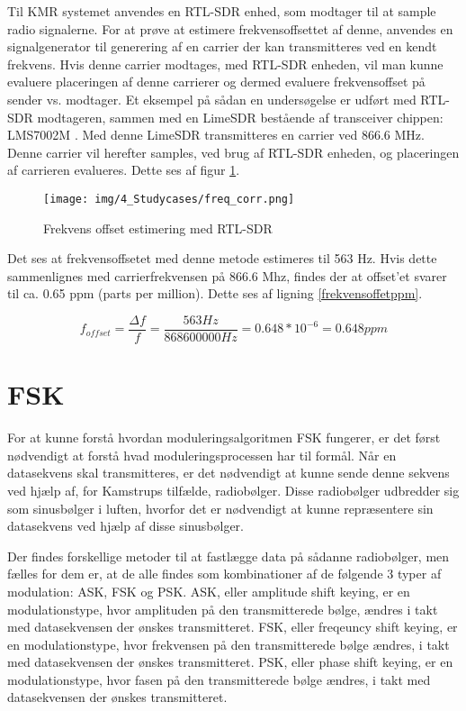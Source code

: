 \begin{appendices}
Til KMR systemet anvendes en RTL-SDR enhed, som modtager til at sample radio signalerne. For at prøve at estimere frekvensoffsettet af denne, anvendes en signalgenerator til generering af en carrier der kan transmitteres ved en kendt frekvens. Hvis denne carrier modtages, med RTL-SDR enheden, vil man kunne evaluere placeringen af denne carrierer og dermed evaluere frekvensoffset på sender vs. modtager. Et eksempel på sådan en undersøgelse er udført med RTL-SDR modtageren, sammen med en LimeSDR bestående af transceiver chippen: LMS7002M \cite{lms7002}. Med denne LimeSDR transmitteres en carrier ved 866.6 MHz. Denne carrier vil herefter samples, ved brug af RTL-SDR enheden, og placeringen af carrieren evalueres. Dette ses af figur \ref{fig:freq_corr}.

\begin{figure}[H]
	\centering{}
	\texttt{[image: img/4\_Studycases/freq\_corr.png]}
	\caption{Frekvens offset estimering med RTL-SDR}
	\label{fig:freq_corr}
\end{figure} 

Det ses at frekvensoffsetet med denne metode estimeres til 563 Hz. Hvis dette sammenlignes med carrierfrekvensen på 866.6 Mhz, findes der at offset'et svarer til ca. 0.65 ppm (parts per million). Dette ses af ligning \ref{frekvensoffetppm}.

\begin{equation} \label{frekvensoffetppm}
f_{offset} = \frac{\Delta f}{f} = \frac{563 Hz}{868600000 Hz} = 0.648 * 10^{-6} = 0.648ppm
\end{equation}

\pagebreak

\section{FSK} \label{appendix::studycase::fsk}
For at kunne forstå hvordan moduleringsalgoritmen FSK fungerer, er det først nødvendigt at forstå hvad moduleringsprocessen har til formål. Når en datasekvens skal transmitteres, er det nødvendigt at kunne sende denne sekvens ved hjælp af, for Kamstrups tilfælde, radiobølger. Disse radiobølger udbredder sig som sinusbølger i luften, hvorfor det er nødvendigt at kunne repræsentere sin datasekvens ved hjælp af disse sinusbølger. 

Der findes forskellige metoder til at fastlægge data på sådanne radiobølger, men fælles for dem er, at de alle findes som kombinationer af de følgende 3 typer af modulation: ASK, FSK og PSK. \newline
ASK, eller amplitude shift keying, er en modulationstype, hvor amplituden på den transmitterede bølge, ændres i takt med datasekvensen der ønskes transmitteret. FSK, eller freqeuncy shift keying, er en modulationstype, hvor frekvensen på den transmitterede bølge ændres, i takt med datasekvensen der ønskes transmitteret. PSK, eller phase shift keying, er en modulationstype, hvor fasen på den transmitterede bølge ændres, i takt med datasekvensen der ønskes transmitteret. 


\end{appendices}
